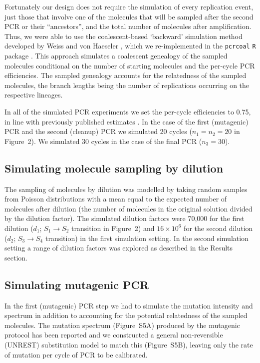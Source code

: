 \documentclass[10pt]{article}
\begin{document}
Fortunately our design does not require the simulation of every replication event, just those that involve one of the molecules that will be sampled after the second PCR or their ``ancestors'', and the total number of molecules after amplification. Thus, we were able to use the coalescent-based `backward' simulation method developed by Weiss and von Haeseler \cite{Weiss1997}, which we re-implemented in the {\tt pcrcoal} {\tt R} package \cite{pcrcoal}. This approach simulates a coalescent genealogy of the sampled molecules conditional on the number of starting molecules and the per-cycle PCR efficiencies. The sampled genealogy accounts for the relatedness of the sampled molecules, the branch lengths being the number of replications occurring on the respective lineages.

In all of the simulated PCR experiments we set the per-cycle efficiencies to 0.75, in line with previously published estimates \cite{Weiss1997}.
In the case of the first (mutagenic) PCR and the second (cleanup) PCR we simulated 20 cycles ($n_1 = n_2 = 20$ in Figure~2). We simulated 30 cycles in the case of the final PCR ($n_3 = 30$).

\subsection*{Simulating molecule sampling by dilution}

The sampling of molecules by dilution was modelled by taking random samples from Poisson distributions \cite{Stallard06} with a mean equal to the expected number of molecules after dilution (the number of molecules in the original solution divided by the dilution factor). The simulated dilution factors were 70,000 for the first dilution ($d_1$; $S_1 \rightarrow S_2$ transition in Figure~2) and $16 \times 10^6$ for the second dilution ($d_2$; $S_3 \rightarrow S_4$ transition) in the first simulation setting. In the second simulation setting a range of dilution factors was explored as described in the Results section.

\subsection*{Simulating mutagenic PCR}

In the first (mutagenic) PCR step we had to simulate the mutation intensity and spectrum in addition to accounting for the potential relatedness of the sampled molecules. The mutation spectrum (Figure~S5A) produced by the mutagenic protocol has been reported \cite{Zaccolo1996} and we constructed a general non-reversible (UNREST) substitution model \cite{Yang94} to match this (Figure~S5B), leaving only the rate of mutation per cycle of PCR to be calibrated.
\end{document}
